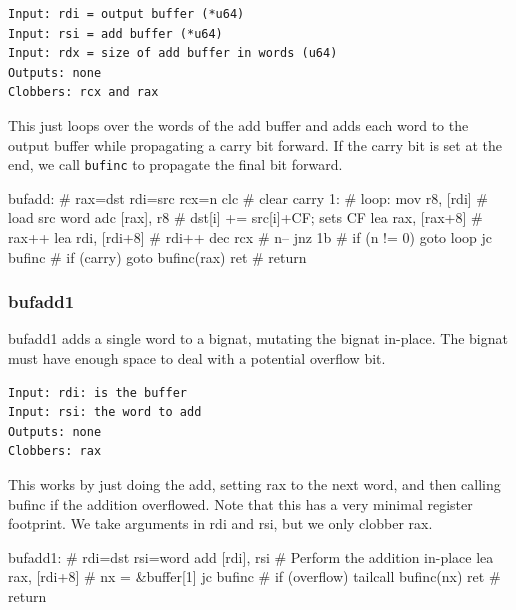 \begin{verbatim}
Input: rdi = output buffer (*u64)
Input: rsi = add buffer (*u64)
Input: rdx = size of add buffer in words (u64)
Outputs: none
Clobbers: rcx and rax
\end{verbatim}

This just loops over the words of the add buffer and adds each word to
the output buffer while propagating a carry bit forward.  If the carry
bit is set at the end, we call \lstinline|bufinc| to propagate the final
bit forward.

\begin{asm}
bufadd:                                     # rax=dst rdi=src rcx=n
	clc                                 #   clear carry
1:                                          # loop:
	mov	r8, [rdi]                   #   load src word
	adc	[rax], r8                   #   dst[i] += src[i]+CF; sets CF
	lea	rax, [rax+8]                #   rax++
	lea	rdi, [rdi+8]                #   rdi++
	dec	rcx                         #   n--
	jnz	1b                          #   if (n != 0) goto loop
	jc	bufinc                      #   if (carry) goto bufinc(rax)
	ret                                 #   return
\end{asm}

\subsubsection{bufadd1}

bufadd1 adds a single word to a bignat, mutating the bignat in-place.
The bignat must have enough space to deal with a potential overflow bit.

\begin{verbatim}
Input: rdi: is the buffer
Input: rsi: the word to add
Outputs: none
Clobbers: rax
\end{verbatim}

This works by just doing the add, setting rax to the next word, and
then calling bufinc if the addition overflowed.  Note that this has
a very minimal register footprint.  We take arguments in rdi and rsi,
but we only clobber rax.

\begin{asm}
bufadd1:                                    # rdi=dst rsi=word
	add	[rdi], rsi                  # Perform the addition in-place
	lea	rax, [rdi+8]                # nx = &buffer[1]
	jc	bufinc                      # if (overflow) tailcall bufinc(nx)
	ret                                 # return
\end{asm}

